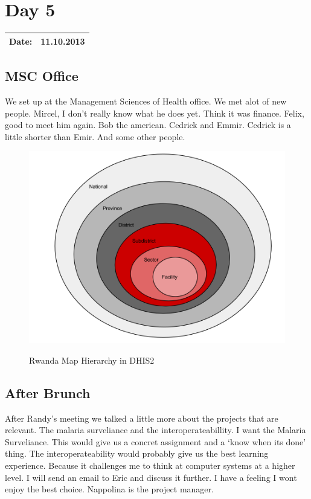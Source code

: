 \section{Day 5}
\begin{tabular}{|c|c|}
\hline
Date: & 11.10.2013 \\
\hline
\end{tabular}
\subsection{MSC Office}
We set up at the Management Sciences of Health office. We met alot of new people. Mircel, I don't really know what he does yet. Think it was finance. Felix, good to meet him again. Bob the american. Cedrick and Emmir. Cedrick is a little shorter than Emir. And some other people.\\
\begin{figure}[p]
\centering
\includegraphics[width=15cm]{appendix/images/dhis2_rwanda_map_hierarchy}\\
\caption{Rwanda Map Hierarchy in DHIS2}
\label{Rwanda Map Hierarchy in DHIS2}
\end{figure}
\subsection{After Brunch}
After Randy's meeting we talked a little more about the projects that are relevant. The malaria surveliance and the interoperateabillity. I want the Malaria Surveliance. This would give us a concret assignment and a `know when its done' thing. The interoperateability would probably give us the best learning experience. Because it challenges me to think at computer systems at a higher level. I will send an email to Eric and discuss it further. I have a feeling I wont enjoy the best choice. Nappolina is the project manager.
